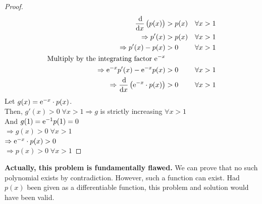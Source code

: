 \documentclass[14]{article}
\theoremstyle{definition}
\theoremstyle{case}
\begin{document}
\begin{proof}
\begin{align*}
\dfrac{\dif}{\dif x} \left(p(x)\right) &> p(x) && \forall x > 1\\
\Rightarrow p'(x) &> p(x) && \forall x > 1\\
\Rightarrow p'(x) - p(x) &> 0 && \forall x > 1\\
\text{Multiply by the integrating factor } {\rm e}^{-x}\\
\Rightarrow {\rm e}^{-x} p'(x) - {\rm e}^{-x} p(x) &> 0 && \forall x > 1\\
\Rightarrow \dfrac{\dif}{\dif x} \left( {\rm e}^{-x} \cdot p(x) \right) &>0 && \forall x > 1
\end{align*}
Let $g(x) = {\rm e}^{-x}\cdot p(x)$.\\
Then, $g'(x) > 0 \; \forall x > 1 \Rightarrow g$ is strictly increasing $\forall x > 1$\\
And $g(1) = {\rm e}^{-1} p(1) = 0$\\
$\Rightarrow g(x) > 0 \; \forall x > 1$\\
$\Rightarrow {\rm e}^{-x} \cdot p(x) > 0$\\ 
$\Rightarrow p(x) > 0 \; \forall x > 1$
\end{proof}
\textbf{Actually, this problem is fundamentally flawed.} We can prove that no such polynomial exists by contradiction. However, such a function can exist. Had $p(x)$ been given as a differentiable function, this problem and solution would have been valid.
\pagebreak
\end{document}
